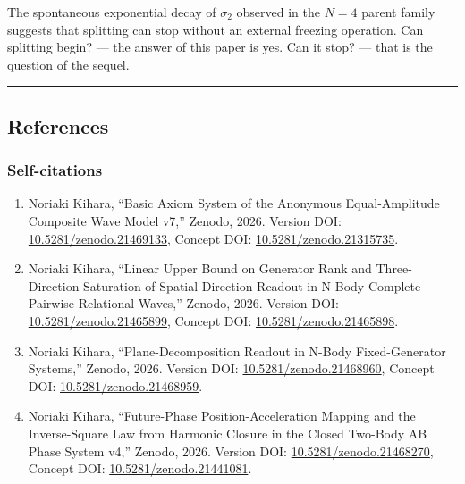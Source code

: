 \documentclass[
  a4paper,
]{article}
\providecommand{\tightlist}{%
  \setlength{\itemsep}{0pt}\setlength{\parskip}{0pt}}
\begin{document}
The spontaneous exponential decay of \(\sigma_2\) observed in the
\(N=4\) parent family suggests that splitting can stop without an
external freezing operation. Can splitting begin? --- the answer of this
paper is yes. Can it stop? --- that is the question of the sequel.

\begin{center}\rule{0.5\linewidth}{0.5pt}\end{center}

\subsection{References}\label{references}

\subsubsection{Self-citations}\label{self-citations}

\begin{enumerate}
\def\labelenumi{\arabic{enumi}.}
\tightlist
\item
  Noriaki Kihara, ``Basic Axiom System of the Anonymous Equal-Amplitude
  Composite Wave Model v7,'' Zenodo, 2026. Version DOI:
  \href{https://doi.org/10.5281/zenodo.21469133}{10.5281/zenodo.21469133},
  Concept DOI:
  \href{https://doi.org/10.5281/zenodo.21315735}{10.5281/zenodo.21315735}.
\item
  Noriaki Kihara, ``Linear Upper Bound on Generator Rank and
  Three-Direction Saturation of Spatial-Direction Readout in N-Body
  Complete Pairwise Relational Waves,'' Zenodo, 2026. Version DOI:
  \href{https://doi.org/10.5281/zenodo.21465899}{10.5281/zenodo.21465899},
  Concept DOI:
  \href{https://doi.org/10.5281/zenodo.21465898}{10.5281/zenodo.21465898}.
\item
  Noriaki Kihara, ``Plane-Decomposition Readout in N-Body
  Fixed-Generator Systems,'' Zenodo, 2026. Version DOI:
  \href{https://doi.org/10.5281/zenodo.21468960}{10.5281/zenodo.21468960},
  Concept DOI:
  \href{https://doi.org/10.5281/zenodo.21468959}{10.5281/zenodo.21468959}.
\item
  Noriaki Kihara, ``Future-Phase Position-Acceleration Mapping and the
  Inverse-Square Law from Harmonic Closure in the Closed Two-Body AB
  Phase System v4,'' Zenodo, 2026. Version DOI:
  \href{https://doi.org/10.5281/zenodo.21468270}{10.5281/zenodo.21468270},
  Concept DOI:
  \href{https://doi.org/10.5281/zenodo.21441081}{10.5281/zenodo.21441081}.
\end{enumerate}
\end{document}
